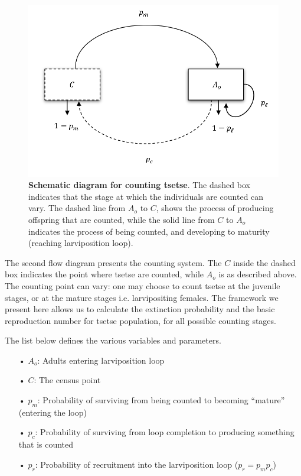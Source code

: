 \documentclass[smallextended]{svjour3}
\begin{document}
	\begin{figure}[hbt!]
		\centering
		\includegraphics[width=0.7\linewidth]{Compflowchart.png}
		\caption{\textbf{Schematic diagram for counting tsetse}. The dashed box indicates that the stage at which the individuals are counted can vary. The dashed line from $A_{o}$ to $C$, shows the process of producing offspring that are counted, while the solid line from $C$ to $A_{o}$ indicates the process of being counted, and developing to maturity (reaching larviposition loop).}
		\label{fig:compflowchart}
	\end{figure}
	
	The second flow diagram presents the counting system. The $C$ inside the dashed box indicates the point where tsetse are counted, while $A_{o}$ is as described above. The counting point can vary: one may choose to count tsetse at the juvenile stages, or at the mature stages i.e. larvipositing females. The framework we present here allows us to calculate the extinction probability and the basic reproduction number for tsetse population, for all possible counting stages. 
	
	The list below defines the various variables and parameters.
	
	\begin{itemize}
		\item[•] $A_{o}$: Adults entering larviposition loop
		\item[•] $C$: The census point
		\item[•]$p_m$: Probability of surviving from being counted to becoming “mature” (entering the loop)
		\item[•]$p_c$: Probability of surviving from loop completion to producing something that is counted
		\item[•]$p_r$: Probability of recruitment into the larviposition loop ($p_r = p_mp_c$)
	\end{itemize}
	
\end{document}
